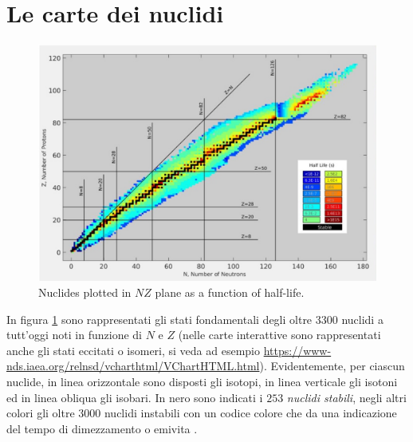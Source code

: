 \section{Le carte dei nuclidi}\label{sec:le-carte-dei-nuclidi}
    \begin{figure}
        \centering
        \includegraphics{../figs/nuclides-chart-emilife}
        \caption{Nuclides plotted in $ NZ $ plane as a function of half-life.}
        \label{fig:nuclides-chart-emilife}
    \end{figure}
In figura \ref{fig:nuclides-chart-emilife} sono rappresentati gli stati fondamentali degli oltre 3300 nuclidi a tutt’oggi
noti in funzione di $ N $ e $ Z $ (nelle carte interattive sono rappresentati anche gli stati eccitati o isomeri, 
si veda ad esempio \url{https://www-nds.iaea.org/relnsd/vcharthtml/VChartHTML.html}).
Evidentemente, per ciascun nuclide, in linea orizzontale sono disposti gli isotopi, in linea verticale gli isotoni ed
in linea obliqua gli isobari.
In nero sono indicati i $253$ \emph{nuclidi stabili}, negli altri colori gli oltre $3000$ nuclidi instabili con un
codice colore che da una indicazione del tempo di dimezzamento o emivita
. %

